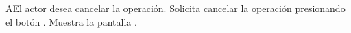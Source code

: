 
\begin{UCtrayectoriaA}{A}{El actor desea cancelar la operación.}
	\UCpaso [\UCactor] Solicita cancelar la operación presionando el botón .
	\UCpaso Muestra la pantalla .
\end{UCtrayectoriaA}

